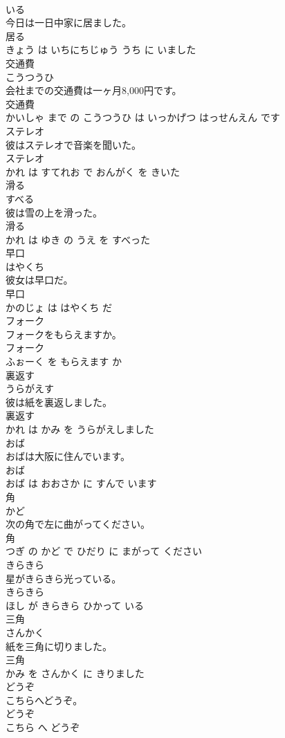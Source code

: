 \documentclass[8pt]{extreport}
\begin{document}
\begin{CJK}{UTF8}{min}
\\	いる			
\\	今日は一日中家に居ました。	
\\	居る 
\\	きょう は いちにちじゅう うち に いました			
\\	交通費	
\\	こうつうひ			
\\	会社までの交通費は一ヶ月8,000円です。	
\\	交通費 
\\	かいしゃ まで の こうつうひ は いっかげつ はっせんえん です			
\\	ステレオ	
\\	彼はステレオで音楽を聞いた。	
\\	ステレオ 
\\	かれ は すてれお で おんがく を きいた			
\\	滑る	
\\	すべる			
\\	彼は雪の上を滑った。	
\\	滑る 
\\	かれ は ゆき の うえ を すべった			
\\	早口	
\\	はやくち			
\\	彼女は早口だ。	
\\	早口 
\\	かのじょ は はやくち だ			
\\	フォーク	
\\	フォークをもらえますか。	
\\	フォーク 
\\	ふぉーく を もらえます か			
\\	裏返す	
\\	うらがえす			
\\	彼は紙を裏返しました。	
\\	裏返す 
\\	かれ は かみ を うらがえしました			
\\	おば	
\\	おばは大阪に住んでいます。	
\\	おば 
\\	おば は おおさか に すんで います			
\\	角	
\\	かど			
\\	次の角で左に曲がってください。	
\\	角 
\\	つぎ の かど で ひだり に まがって ください			
\\	きらきら	
\\	星がきらきら光っている。	
\\	きらきら 
\\	ほし が きらきら ひかって いる			
\\	三角	
\\	さんかく			
\\	紙を三角に切りました。	
\\	三角 
\\	かみ を さんかく に きりました			
\\	どうぞ	
\\	こちらへどうぞ。	
\\	どうぞ 
\\	こちら へ どうぞ			
\end{CJK}
\end{document}
